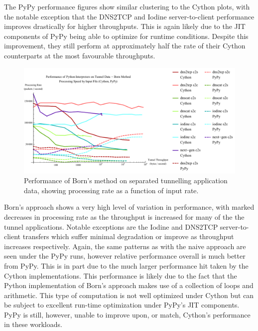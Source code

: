 \documentclass[12pt]{report}
\theoremstyle{remark}
\theoremstyle{definition}
\theoremstyle{definition}
\theoremstyle{definition}
\begin{document}
The PyPy performance figures show similar clustering to the Cython plots, with
the notable exception that the DNS2TCP and Iodine server-to-client performance
improves drastically for higher throughputs. This is again likely due to the JIT
components of PyPy being able to optimize for runtime conditions. Despite this
improvement, they still perform at approximately half the rate of their Cython
counterparts at the most favourable throughputs.

\begin{figure}
\centering
\includegraphics[width=\textwidth]{figures/ppia-born.pdf}
\caption[Performance of Born's Method on Tunnel Data by Python
Interpreter]{Performance of Born's method on separated tunnelling application
data, showing processing rate as a function of input rate.}
\label{ppia-born}
\end{figure}

Born's approach shows a very high level of variation in performance, with marked
decreases in processing rate as the throughput is increased for many of the the
tunnel applications. Notable exceptions are the Iodine and DNS2TCP
server-to-client transfers which suffer minimal degradation or improve as
throughput increases respectively. Again, the same patterns as with the naive
approach are seen under the PyPy runs, however relative performance overall is much
better from PyPy. This is in part due to the much larger performance hit taken
by the Cython implementations. This performance is likely due to the fact that
the Python implementation of Born's approach makes use of a collection of loops
and arithmetic. This type of computation is not well optimized under Cython but
can be subject to excellent run-time optimization under PyPy's JIT components.
PyPy is still, however, unable to improve upon, or match, Cython's performance in these
workloads.
\end{document}
